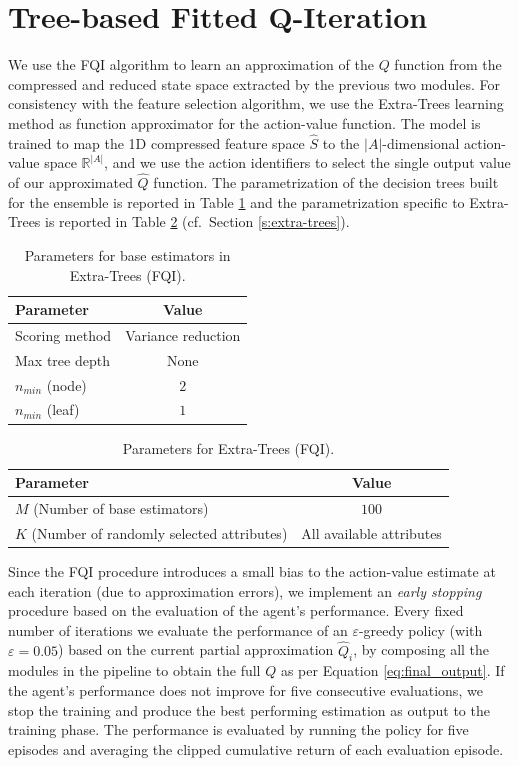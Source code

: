 \section{Tree-based Fitted Q-Iteration}
We use the FQI algorithm to learn an approximation of the $Q$ function from the
compressed and reduced state space extracted by the previous two modules. 
For consistency with the feature selection algorithm, we use the Extra-Trees 
learning method as function approximator for the action-value function.
The model is trained to map the 1D compressed feature space $\hat{S}$ to the 
$|A|$-dimensional action-value space $\mathbb{R}^{|A|}$, and we use the action 
identifiers to select the single output value of our approximated $\hat{Q}$ 
function. 
The parametrization of the decision trees built for the ensemble is reported in
Table \ref{t:FQI_tree_params} and the parametrization specific to Extra-Trees 
is reported in Table \ref{t:FQI_extra_params} (cf.\ Section \ref{s:extra-trees}).
%
\begin{table}	
    \centering
    \begin{tabular}{l c} 
	\hline
	Parameter & Value \\ 
	\hline 
	Scoring method &  Variance reduction \\
	Max tree depth & None \\
	$n_{min}$ (node) & $2$\\
	$n_{min}$ (leaf) & $1$ \\
	\hline
    \end{tabular}
    \caption[Parameters for base estimators in Extra-Trees (FQI)]{Parameters for
	     base estimators in Extra-Trees (FQI).}
    \label{t:FQI_tree_params}
\end{table}
%
%
\begin{table}
    \centering
    \begin{tabular}{l c} 
	\hline
	Parameter & Value \\ 
	\hline 
	$M$ (Number of base estimators) & $100$ \\
	$K$ (Number of randomly selected attributes) &  All available attributes \\
	\hline
    \end{tabular}
    \caption[Parameters for Extra-Trees (FQI)]{Parameters for Extra-Trees (FQI).}
    \label{t:FQI_extra_params}
\end{table}
%

Since the FQI procedure introduces a small bias to the action-value estimate at 
each iteration (due to approximation errors), we implement an \textit{early 
stopping} procedure based on the evaluation of the agent's performance.
Every fixed number of iterations we evaluate the performance of an 
$\varepsilon$-greedy policy (with $\varepsilon = 0.05$) based on the current 
partial approximation $\hat{Q}_i$, by composing all the modules in the pipeline 
to obtain the full $Q$ as per Equation \eqref{eq:final_output}. 
If the agent's performance does not improve for five consecutive evaluations, we 
stop the training and produce the best performing estimation as output to the 
training phase.
The performance is evaluated by running the policy for five episodes and 
averaging the clipped cumulative return of each evaluation episode. 


